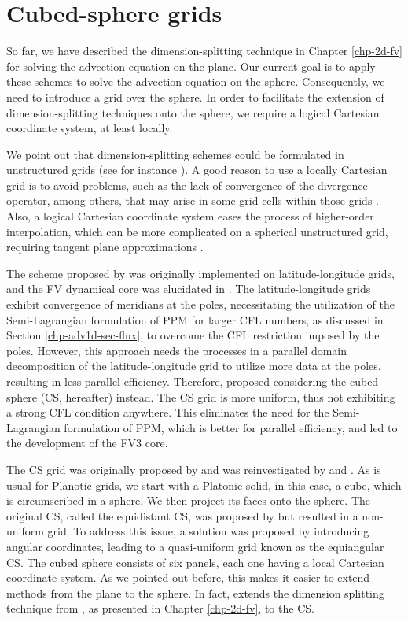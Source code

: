 \chapter{Cubed-sphere grids}
\label{chp-cs-grids}
So far, we have described the dimension-splitting technique in Chapter \ref{chp-2d-fv} for solving the advection equation on the plane.
Our current goal is to apply these schemes to solve the advection equation on the sphere.
Consequently, we need to introduce a grid over the sphere.
In order to facilitate the extension of dimension-splitting techniques onto the sphere, we require a logical Cartesian coordinate system, at least locally.

We point out that dimension-splitting schemes could be formulated in unstructured grids (see for instance \citet{herzfeld:2023}).
A good reason to use a locally Cartesian grid is to avoid problems, such as the lack of convergence of the divergence operator, among others,
that may arise in some grid cells within those grids \citep{peixoto:2013, peixoto:2016, weller:2012}.
Also, a logical Cartesian coordinate system eases the process of higher-order interpolation,
which can be more complicated on a spherical unstructured grid, requiring tangent plane approximations \citep{peixoto:2014,skamarock:2011}.

The scheme proposed by \citet{lin:1996} was originally implemented on latitude-longitude grids,
and the FV dynamical core was elucidated in \citet{lin:2004}.
The latitude-longitude grids exhibit convergence of meridians at the poles, 
necessitating the utilization of the Semi-Lagrangian formulation of PPM for larger CFL numbers,
as discussed in Section \ref{chp-adv1d-sec-flux}, 
to overcome the CFL restriction imposed by the poles.
However, this approach needs the processes in a parallel domain decomposition of the latitude-longitude grid to utilize more
data at the poles, resulting in less parallel efficiency.
Therefore, \citet{putman:2007} proposed considering the cubed-sphere (CS, hereafter) instead.
The CS grid is more uniform, thus not exhibiting a strong CFL condition anywhere.
This eliminates the need for the Semi-Lagrangian formulation of PPM, which is better for parallel efficiency, and led to the development of the FV3 core.

The CS grid was originally proposed by \citet{sadourny:1972} and was 
reinvestigated by \citet{ronchi:1996} and \citet{rancic:1996}. 
As is usual for Planotic grids, we start with a Platonic solid, in this case, a cube, 
which is circumscribed in a sphere. We then project its faces onto the sphere.
The original CS, called the equidistant CS, was proposed by 
\citet{sadourny:1972} but resulted in a non-uniform grid. 
To address this issue, a solution was proposed by introducing angular coordinates, 
leading to a quasi-uniform grid known as the equiangular CS.
The cubed sphere consists of six panels, each one having a local Cartesian coordinate 
system. 
As we pointed out before, this makes it easier to extend methods from the plane to the sphere. 
In fact, \citet{putman:2007} extends the dimension splitting technique from 
\citet{lin:1996}, as presented in Chapter \ref{chp-2d-fv}, to the CS.

